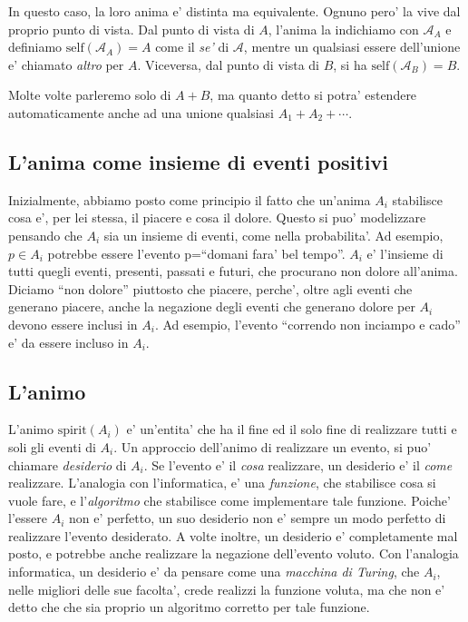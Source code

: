 In questo caso, la loro anima e' distinta ma equivalente.  Ognuno pero' la vive dal proprio punto di vista. Dal punto di vista di $A$, l'anima la indichiamo con $\mathcal{A}_A$ e definiamo $\textrm{self}(\mathcal{A}_A)=A$ come il \emph{se'} di $\mathcal{A}$, mentre un qualsiasi essere dell'unione e' chiamato \emph{altro} per $A$. Viceversa, dal punto di vista di $B$, si ha $\textrm{self}(\mathcal{A}_B)=B$.

Molte volte parleremo solo di $A+B$, ma quanto detto si potra' estendere automaticamente anche ad una unione qualsiasi $A_1+A_2+\cdots$. \\

\subsection{L'anima come insieme di eventi positivi}
\label{AnimaInsiemeEventi}
Inizialmente, abbiamo posto come principio il fatto che un'anima $A_i$ stabilisce cosa e', per lei stessa, il piacere e cosa il dolore. Questo si puo' modelizzare pensando che $A_i$ sia un insieme di eventi, come nella probabilita'. Ad esempio, $p\in A_i$ potrebbe essere l'evento p=``domani fara' bel tempo''. $A_i$ e' l'insieme di tutti quegli eventi, presenti, passati e futuri, che procurano non dolore all'anima. Diciamo ``non dolore'' piuttosto che piacere, perche', oltre agli eventi che generano piacere, anche la negazione degli eventi che generano dolore per $A_i$ devono essere inclusi in $A_i$. Ad esempio, l'evento ``correndo non inciampo e cado'' e' da essere incluso in $A_i$.


\subsection{L'animo}

\def\des{\textrm{des}}
\label{defDiDesideriDes}

\def\anima#1{\mathcal{#1}}

\def\spirit#1{\textrm{spirit}(#1)}
\def\Animo#1{\spirit{\anima{#1}}}

L'animo $\spirit{A_i}$ e' un'entita' che ha il fine ed il solo fine di realizzare tutti e soli gli eventi di $A_i$. Un approccio dell'animo di realizzare un evento, si puo' chiamare \emph{desiderio} di $A_i$. Se l'evento e' il \emph{cosa} realizzare, un desiderio e' il \emph{come} realizzare. L'analogia con l'informatica, e' una \emph{funzione}, che stabilisce cosa si vuole fare, e l'\emph{algoritmo} che stabilisce come implementare tale funzione. Poiche' l'essere $A_i$ non e' perfetto, un suo desiderio non e' sempre un modo perfetto di realizzare l'evento desiderato. A volte inoltre, un desiderio e' completamente mal posto, e potrebbe anche realizzare la negazione dell'evento voluto. Con l'analogia informatica, un desiderio e' da pensare come una \emph{macchina di Turing}, che $A_i$, nelle migliori delle sue facolta', crede realizzi la funzione voluta, ma che non e' detto che che sia proprio un algoritmo corretto per tale funzione.

